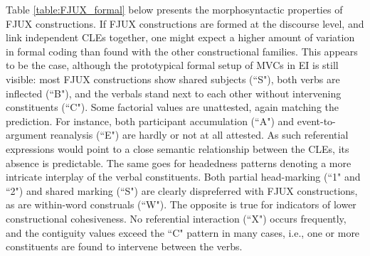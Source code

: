 Table \ref{table:FJUX_formal} below presents the morphosyntactic properties of FJUX constructions. If FJUX constructions are formed at the discourse level, and link independent CLEs together, one might expect a higher amount of variation in formal coding than found with the other constructional families. This appears to be the case, although the prototypical formal setup of MVCs in EI is still visible: most FJUX constructions show shared subjects (``S"), both verbs are inflected (``B"), and the verbals stand next to each other without intervening constituents (``C"). Some factorial values are unattested, again matching the prediction. For instance, both participant accumulation (``A") and event-to-argument reanalysis (``E") are hardly or not at all attested. As such referential expressions would point to a close semantic relationship between the CLEs, its absence is predictable. The same goes for headedness patterns denoting a more intricate interplay of the verbal constituents. Both partial head-marking (``1" and ``2") and shared marking (``S") are clearly dispreferred with FJUX constructions, as are within-word construals (``W"). The opposite is true for indicators of lower constructional cohesiveness. No referential interaction (``X") occurs frequently, and the contiguity values exceed the ``C" pattern in many cases, i.e., one or more constituents are found to intervene between the verbs.


